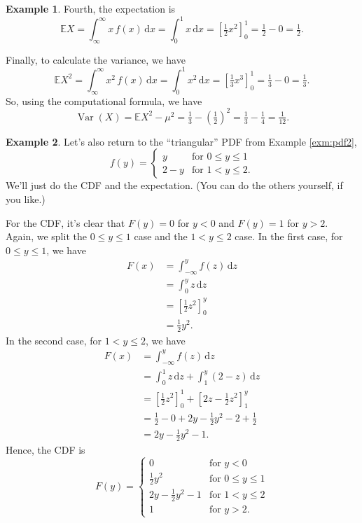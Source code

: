 \documentclass[
  a4paper,
]{book}
\theoremstyle{definition}
\theoremstyle{definition}
\newtheorem{example}{Example}[chapter]
\theoremstyle{definition}
\theoremstyle{definition}
\theoremstyle{remark}
\begin{document}
\begin{example}
Fourth, the expectation is
\[ \mathbb EX = \int_{\infty}^\infty x\,f(x)\,\mathrm dx = \int_0^1 x \, \mathrm dx = \left[\tfrac12 x^2 \right]_0^1 = \tfrac12 - 0 = \tfrac12 .   \]

Finally, to calculate the variance, we have
\[ \mathbb EX^2 = \int_{\infty}^\infty x^2\,f(x)\,\mathrm dx = \int_0^1 x^2 \, \mathrm dx = \left[\tfrac13 x^3 \right]_0^1 = \tfrac13 - 0 = \tfrac13 .   \]
So, using the computational formula, we have
\[ \operatorname{Var}(X) = \mathbb EX^2 - \mu^2 = \tfrac13 - \left(\tfrac12\right)^2 = \tfrac13 - \tfrac14 = \tfrac{1}{12} . \]
\end{example}

\begin{example}
Let's also return to the ``triangular'' PDF from Example \ref{exm:pdf2},
\[ f(y) = \begin{cases} y & \text{for $0 \leq y \leq 1$} \\
2-y & \text{for $1 < y \leq 2$}. \end{cases} \]
We'll just do the CDF and the expectation. (You can do the others yourself, if you like.)

For the CDF, it's clear that \(F(y) = 0\) for \(y < 0\) and \(F(y) = 1\) for \(y > 2\). Again, we split the \(0 \leq y \leq 1\) case and the \(1 < y \leq 2\) case. In the first case, for \(0 \leq y \leq 1\), we have
\begin{align*}
  F(x) &= \int_{-\infty}^y f(z) \, \mathrm dz \\
    &= \int_0^y z \, \mathrm dz \\
    &= \left[ \tfrac12 z^2 \right]_0^y \\
    &= \tfrac 12 y^2 .
\end{align*}
In the second case, for \(1 < y \leq 2\), we have
\begin{align*}
  F(x) &= \int_{-\infty}^y f(z) \, \mathrm dz \\
    &= \int_0^1 z \, \mathrm dz + \int_1^y (2 - z)\,\mathrm dz \\
    &= \left[ \tfrac12 z^2 \right]_0^1 + \left[ 2z - \tfrac12 z^2 \right]_1^y \\
    &= \tfrac 12 - 0 + 2y - \tfrac12 y^2 - 2 + \tfrac12 \\
    &= 2y - \tfrac12 y^2 - 1  .
\end{align*}
Hence, the CDF is
\[ F(y) = \begin{cases} 0 & \text{for $y < 0$} \\
            \tfrac12 y^2 & \text{for $0 \leq y \leq 1$} \\
            2y - \tfrac12 y^2 - 1  & \text{for $1 < y \leq 2$} \\
            1 & \text{for $y > 2$}. \end{cases} \]


\end{example}
\end{document}

